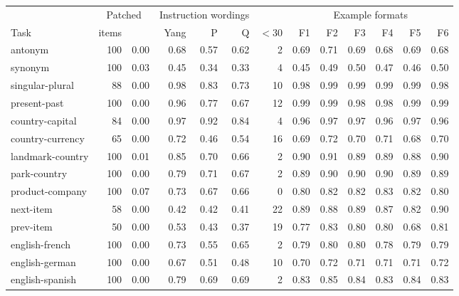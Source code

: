 \begin{tabular}{@{}lrrrrrrrrrrrr@{}}
\toprule
 & \multicolumn{2}{c}{Patched} & \multicolumn{3}{c}{Instruction wordings} & & \multicolumn{6}{c}{Example formats} \\
\cmidrule(lr){2-3}\cmidrule(lr){4-6}\cmidrule(lr){8-13}
Task & items & \p{ x:} & Yang & P & Q & $<$30 & F1 & F2 & F3 & F4 & F5 & F6 \\
\midrule
antonym & 100 & 0.00 & 0.68 & 0.57 & 0.62 & 2 & 0.69 & 0.71 & 0.69 & 0.68 & 0.69 & 0.68 \\
synonym & 100 & 0.03 & 0.45 & 0.34 & 0.33 & 4 & 0.45 & 0.49 & 0.50 & 0.47 & 0.46 & 0.50 \\
singular-plural & 88 & 0.00 & 0.98 & 0.83 & 0.73 & 10 & 0.98 & 0.99 & 0.99 & 0.99 & 0.99 & 0.98 \\
present-past & 100 & 0.00 & 0.96 & 0.77 & 0.67 & 12 & 0.99 & 0.99 & 0.98 & 0.98 & 0.99 & 0.99 \\
country-capital & 84 & 0.00 & 0.97 & 0.92 & 0.84 & 4 & 0.96 & 0.97 & 0.97 & 0.96 & 0.97 & 0.96 \\
country-currency & 65 & 0.00 & 0.72 & 0.46 & 0.54 & 16 & 0.69 & 0.72 & 0.70 & 0.71 & 0.68 & 0.70 \\
landmark-country & 100 & 0.01 & 0.85 & 0.70 & 0.66 & 2 & 0.90 & 0.91 & 0.89 & 0.89 & 0.88 & 0.90 \\
park-country & 100 & 0.00 & 0.79 & 0.71 & 0.67 & 2 & 0.89 & 0.90 & 0.90 & 0.90 & 0.89 & 0.89 \\
product-company & 100 & 0.07 & 0.73 & 0.67 & 0.66 & 0 & 0.80 & 0.82 & 0.82 & 0.83 & 0.82 & 0.80 \\
next-item & 58 & 0.00 & 0.42 & 0.42 & 0.41 & 22 & 0.89 & 0.88 & 0.89 & 0.87 & 0.82 & 0.90 \\
prev-item & 50 & 0.00 & 0.53 & 0.43 & 0.37 & 19 & 0.77 & 0.83 & 0.80 & 0.80 & 0.68 & 0.81 \\
english-french & 100 & 0.00 & 0.73 & 0.55 & 0.65 & 2 & 0.79 & 0.80 & 0.80 & 0.78 & 0.79 & 0.79 \\
english-german & 100 & 0.00 & 0.67 & 0.51 & 0.48 & 10 & 0.70 & 0.72 & 0.71 & 0.71 & 0.71 & 0.72 \\
english-spanish & 100 & 0.00 & 0.79 & 0.69 & 0.69 & 2 & 0.83 & 0.85 & 0.84 & 0.83 & 0.84 & 0.83 \\
\bottomrule
\end{tabular}
